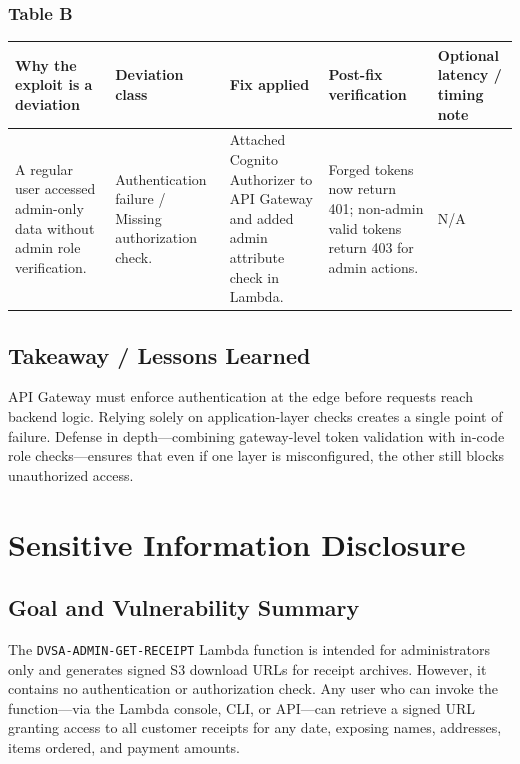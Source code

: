 \documentclass[12pt]{report}
\begin{document}
\subsection*{Table B}
\begin{table}[H]
  \footnotesize
  \centering
  \begin{tabularx}{\textwidth}{|Y|Y|Y|Y|Y|}
    \hline
    \textbf{Why the exploit is a deviation} & \textbf{Deviation class} & \textbf{Fix applied} & \textbf{Post-fix verification} & \textbf{Optional latency / timing note} \\
    \hline
    A regular user accessed admin-only data without admin role verification. &
    Authentication failure / Missing authorization check. &
    Attached Cognito Authorizer to API Gateway and added admin attribute check in Lambda. &
    Forged tokens now return 401; non-admin valid tokens return 403 for admin actions. &
    N/A \\
    \hline
  \end{tabularx}
\end{table}

\section{Takeaway / Lessons Learned}
API Gateway must enforce authentication at the edge before requests reach backend logic. Relying solely on application-layer checks creates a single point of failure. Defense in depth---combining gateway-level token validation with in-code role checks---ensures that even if one layer is misconfigured, the other still blocks unauthorized access.

\clearpage

\chapter{Sensitive Information Disclosure}

\section{Goal and Vulnerability Summary}
The \texttt{DVSA-ADMIN-GET-RECEIPT} Lambda function is intended for administrators only and generates signed S3 download URLs for receipt archives. However, it contains no authentication or authorization check. Any user who can invoke the function---via the Lambda console, CLI, or API---can retrieve a signed URL granting access to all customer receipts for any date, exposing names, addresses, items ordered, and payment amounts.
\end{document}
